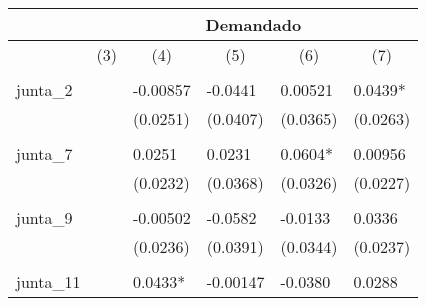 \begin{tabular}{rrrrrr}
\toprule
\multicolumn{1}{c}{} & \multicolumn{5}{c}{Demandado} \\
\midrule
\multicolumn{1}{c}{} & \multicolumn{1}{c}{(3)} & \multicolumn{1}{c}{(4)} & \multicolumn{1}{c}{(5)} & \multicolumn{1}{c}{(6)} & \multicolumn{1}{c}{(7)} \\
\multicolumn{1}{l}{} & \multicolumn{1}{l}{} & \multicolumn{1}{l}{} & \multicolumn{1}{l}{} & \multicolumn{1}{l}{} &  \\
\multicolumn{1}{l}{junta\_2} & \multicolumn{1}{l}{} & \multicolumn{1}{l}{-0.00857} & \multicolumn{1}{l}{-0.0441} & \multicolumn{1}{l}{0.00521} & \multicolumn{1}{l}{0.0439*} \\
\multicolumn{1}{l}{} & \multicolumn{1}{l}{} & \multicolumn{1}{l}{(0.0251)} & \multicolumn{1}{l}{(0.0407)} & \multicolumn{1}{l}{(0.0365)} & \multicolumn{1}{l}{(0.0263)} \\
\multicolumn{1}{l}{} & \multicolumn{1}{l}{} & \multicolumn{1}{l}{} & \multicolumn{1}{l}{} & \multicolumn{1}{l}{} & \multicolumn{1}{l}{} \\
\multicolumn{1}{l}{junta\_7} & \multicolumn{1}{l}{} & \multicolumn{1}{l}{0.0251} & \multicolumn{1}{l}{0.0231} & \multicolumn{1}{l}{0.0604*} & \multicolumn{1}{l}{0.00956} \\
\multicolumn{1}{l}{} & \multicolumn{1}{l}{} & \multicolumn{1}{l}{(0.0232)} & \multicolumn{1}{l}{(0.0368)} & \multicolumn{1}{l}{(0.0326)} & \multicolumn{1}{l}{(0.0227)} \\
\multicolumn{1}{l}{} & \multicolumn{1}{l}{} & \multicolumn{1}{l}{} & \multicolumn{1}{l}{} & \multicolumn{1}{l}{} & \multicolumn{1}{l}{} \\
\multicolumn{1}{l}{junta\_9} & \multicolumn{1}{l}{} & \multicolumn{1}{l}{-0.00502} & \multicolumn{1}{l}{-0.0582} & \multicolumn{1}{l}{-0.0133} & \multicolumn{1}{l}{0.0336} \\
\multicolumn{1}{l}{} & \multicolumn{1}{l}{} & \multicolumn{1}{l}{(0.0236)} & \multicolumn{1}{l}{(0.0391)} & \multicolumn{1}{l}{(0.0344)} & \multicolumn{1}{l}{(0.0237)} \\
\multicolumn{1}{l}{} & \multicolumn{1}{l}{} & \multicolumn{1}{l}{} & \multicolumn{1}{l}{} & \multicolumn{1}{l}{} & \multicolumn{1}{l}{} \\
\multicolumn{1}{l}{junta\_11} & \multicolumn{1}{l}{} & \multicolumn{1}{l}{0.0433*} & \multicolumn{1}{l}{-0.00147} & \multicolumn{1}{l}{-0.0380} & \multicolumn{1}{l}{0.0288} \\

\end{tabular}
